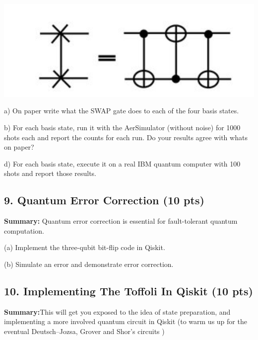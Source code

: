 \documentclass[12pt]{article}
\begin{document}
\includegraphics[scale=.5]{swap.png}

a) On paper write what the SWAP gate does to each of the four basis states.

b) For each basis state, run it with the AerSimulator (without noise) for 1000 shots each and report the counts for each run. Do your results agree with whats on paper?

d) For each basis state, execute it on a real IBM quantum computer with 100 shots and report those results.





\subsection*{9. Quantum Error Correction (10 pts)}

\textbf{Summary:} Quantum error correction is essential for fault-tolerant quantum computation.

(a) Implement the three-qubit bit-flip code in Qiskit.

(b) Simulate an error and demonstrate error correction.

\subsection*{10. Implementing The Toffoli In Qiskit (10 pts)}

\textbf{Summary:}This will get you exposed to the idea of state preparation, and implementing a more involved quantum circuit in Qiskit (to warm us up for the eventual Deutsch–Jozsa, Grover and Shor's circuits \smiley{})
\end{document}

